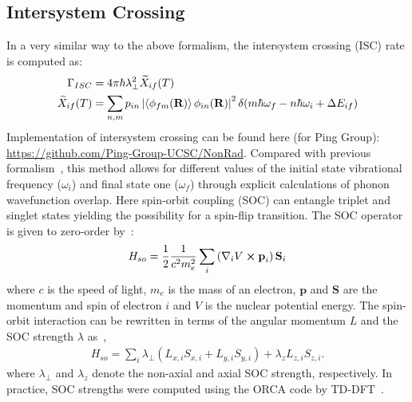 \subsection{Intersystem Crossing}
In a very similar way to the above formalism, the intersystem crossing (ISC) rate is computed as:
\begin{align}
    \Gamma_{ISC} &= 4 \pi \hbar \lambda_\perp^2 \widetilde{X}_{if}(T) \label{eq:isc-full}\\
    \widetilde{X}_{if}(T) &= \sum_{n,m}p_{in} \left|
        \braket{\phi_{fm}(\textbf{R})}{\phi_{in}(\mathbf{R})}
    \right|^2 \delta(m\hbar\omega_f - n\hbar\omega_i+\Delta E_{if}) \label{eq:isc-F}
\end{align}
Implementation of intersystem crossing can be found here (for Ping Group): \url{https://github.com/Ping-Group-UCSC/NonRad}.
Compared with previous formalism~\cite{thiering2017ab}, this method allows for different values of the initial state vibrational frequency ($\omega_i$) and final state one ($\omega_f$) through explicit calculations of phonon wavefunction overlap. Here spin-orbit coupling (SOC) can entangle triplet and singlet states yielding the possibility for a spin-flip transition. The SOC operator is given to zero-order by~\cite{maze2011properties}:
\begin{align}
    H_{so} = \frac{1}{2} \frac{1}{c^2m_e^2} \sum_i \left(
        \nabla_i V \cross \textbf{p}_i \right) \textbf{S}_i \label{eq:soc-full}
\end{align}
where $c$ is the speed of light, $m_e$ is the mass of an electron, $\textbf{p}$ and $\textbf{S}$ are the momentum and spin of electron $i$ and $V$ is the nuclear potential energy. The spin-orbit interaction can be rewritten in terms of the angular momentum $L$ and the SOC strength $\lambda$ as~\cite{maze2011properties},
\begin{align}
    H_{so} = \sum_i \lambda_{\perp} (L_{x,i}S_{x,i} + L_{y,i}S_{y,i}) + \lambda_z L_{z,i}S_{z,i}.
\end{align}
where $\lambda_{\perp}$ and $\lambda_z$ denote the non-axial and axial SOC strength, respectively. In practice, SOC strengths were computed using the ORCA code by TD-DFT~\cite{neese2012orca,de2019predicting}.
